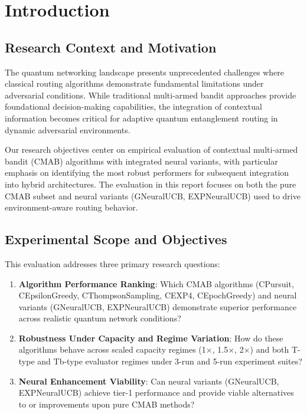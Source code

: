 \documentclass[12pt,a4paper]{article}
\begin{document}
\newpage
\section{Introduction}

\subsection{Research Context and Motivation}

The quantum networking landscape presents unprecedented challenges where classical routing algorithms demonstrate fundamental limitations under adversarial conditions. While traditional multi-armed bandit approaches provide foundational decision-making capabilities, the integration of contextual information becomes critical for adaptive quantum entanglement routing in dynamic adversarial environments.

Our research objectives center on empirical evaluation of contextual multi-armed bandit (CMAB) algorithms with integrated neural variants, with particular emphasis on identifying the most robust performers for subsequent integration into hybrid architectures. The evaluation in this report focuses on both the pure CMAB subset and neural variants (GNeuralUCB, EXPNeuralUCB) used to drive environment-aware routing behavior.

\subsection{Experimental Scope and Objectives}

This evaluation addresses three primary research questions:

\begin{enumerate}
\item \textbf{Algorithm Performance Ranking}: Which CMAB algorithms (CPursuit, CEpsilonGreedy, CThompsonSampling, CEXP4, CEpochGreedy) and neural variants (GNeuralUCB, EXPNeuralUCB) demonstrate superior performance across realistic quantum network conditions?
\item \textbf{Robustness Under Capacity and Regime Variation}: How do these algorithms behave across scaled capacity regimes (1$\times$, 1.5$\times$, 2$\times$) and both T-type and Tb-type evaluator regimes under 3-run and 5-run experiment suites?
\item \textbf{Neural Enhancement Viability}: Can neural variants (GNeuralUCB, EXPNeuralUCB) achieve tier-1 performance and provide viable alternatives to or improvements upon pure CMAB methods?
\end{enumerate}
\end{document}

